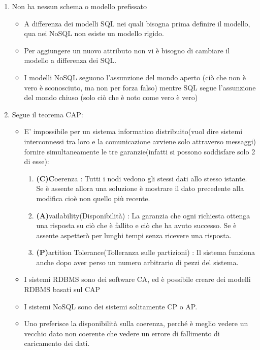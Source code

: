 \documentclass[a4page, 11pt]{article}
\begin{document}
\begin{enumerate}[noitemsep]
	 
	\item
	Non ha nessun schema o modello prefissato
	\begin{itemize}
		
		\item
		A differenza dei modelli SQL nei quali bisogna prima definire il modello, qua nei NoSQL non esiste un modello rigido.
		\item
		Per aggiungere un nuovo attributo non vi è bisogno di cambiare il modello a differenza dei SQL.
		\item
		I modelli NoSQL seguono l'assunzione del mondo aperto (ciò che non è vero è sconosciuto, ma non per forza falso) mentre SQL segue l'assunzione del mondo chiuso (solo ciò che è noto come vero è vero)
	\end{itemize}

	\def\labelenumi{\arabic{enumi}.}
	 
	\item
	Segue il teorema CAP:
	\begin{itemize}
		\item E' impossibile per un sistema informatico distribuito(vuol dire sistemi interconnessi tra loro e la comunicazione avviene solo attraverso messaggi) fornire simultaneamente le tre garanzie(infatti si possono soddisfare solo 2 di esse):
		\begin{enumerate}		
			\item
			\textbf{(C)C}oerenza : Tutti i nodi vedono gli stessi dati allo stesso istante. Se è assente allora una soluzione è mostrare il dato precedente alla modifica cioè non quello più recente.
			\item
			\textbf{(A)}vailability(Disponibilità) : La garanzia che ogni richiesta ottenga una risposta su ciò che è fallito e ciò che ha avuto successo. Se è assente aspetterò per lunghi tempi senza ricevere una risposta.
			\item
			\textbf{(P)}artition Tolerance(Tolleranza sulle partizioni) : Il sistema funziona anche dopo aver perso un numero arbitrario di pezzi del sistema.
		\end{enumerate}
		\item
		I sistemi RDBMS sono dei software CA, ed è possibile creare dei modelli RDBMS basati sul CAP
		\item
		I sistemi NoSQL sono dei sistemi solitamente CP o AP.
		\item
		Uno preferisce la disponibilità sulla coerenza, perché è meglio vedere un vecchio dato non coerente che vedere un errore di fallimento di caricamento dei dati.
	\end{itemize}


\end{enumerate}
\end{document}
